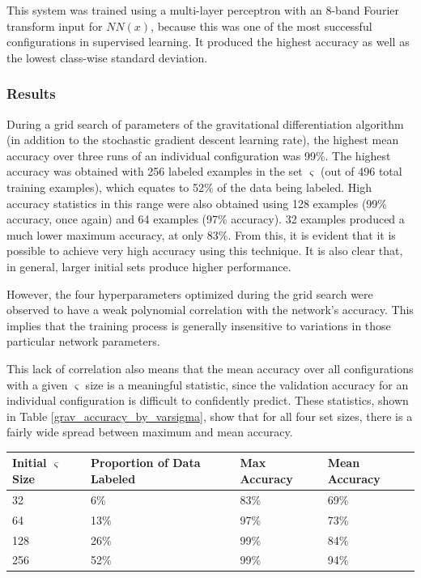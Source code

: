 \documentclass[10pt]{article}
\begin{document}
This system was trained using a multi-layer perceptron with an 8-band Fourier transform input for $NN(x)$, because this was one of the most successful configurations in supervised learning. It produced the highest accuracy as well as the lowest class-wise standard deviation.

\subsubsection{Results}

During a grid search of parameters of the gravitational differentiation algorithm (in addition to the stochastic gradient descent learning rate), the highest mean accuracy over three runs of an individual configuration was 99\%. The highest accuracy was obtained with 256 labeled examples in the set $\varsigma$ (out of 496 total training examples), which equates to 52\% of the data being labeled. High accuracy statistics in this range were also obtained using 128 examples (99\% accuracy, once again) and 64 examples (97\% accuracy). 32 examples produced a much lower maximum accuracy, at only 83\%. From this, it is evident that it is possible to achieve very high accuracy using this technique. It is also clear that, in general, larger initial sets produce higher performance.

However, the four hyperparameters optimized during the grid search were observed to have a weak polynomial correlation with the network's accuracy. This implies that the training process is generally insensitive to variations in those particular network parameters.

This lack of correlation also means that the mean accuracy over all configurations with a given $\varsigma$ size is a meaningful statistic, since the validation accuracy for an individual configuration is difficult to confidently predict. These statistics, shown in Table \ref{grav_accuracy_by_varsigma}, show that for all four set sizes, there is a fairly wide spread between maximum and mean accuracy.

\begin{minipage}{\textwidth}
    \begin{center}
         \label{grav_accuracy_by_varsigma}
        \begin{tabular}{|l|l|l|l|}
            \hline
            Initial $\varsigma$ Size & Proportion of Data Labeled & Max Accuracy & Mean Accuracy \\
            \hline
            32 & 6\% & 83\% & 69\% \\
            \hline
            64 & 13\% & 97\% & 73\% \\
            \hline
            128 & 26\% & 99\% & 84\% \\
            \hline
            256 & 52\% & 99\% & 94\% \\
            \hline
        \end{tabular}
    \end{center}
\end{minipage}
\end{document}
